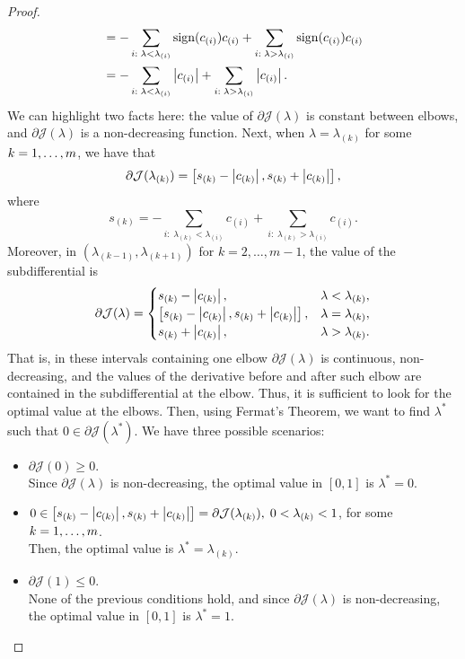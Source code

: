 \begin{proof}
\begin{equation}
\begin{aligned}
            &= - \sum_{i: \; \lambda < \lambda_{(i)}} \operatorname{sign}(c_{(i)}) {c_{(i)}} + \sum_{i: \; \lambda > \lambda_{(i)}} \operatorname{sign}(c_{(i)}) {c_{(i)}} \\
            &= - \sum_{i: \; \lambda < \lambda_{(i)}} \left|c_{(i)}\right| + \sum_{i: \; \lambda > \lambda_{(i)}} \left|c_{(i)}\right| .
        \end{aligned}        
    \end{equation}
    We can highlight two facts here: the value of $\partial \mathcal{J}(\lambda)$ is constant between elbows, and $\partial \mathcal{J}(\lambda)$ is a non-decreasing function.
    Next, when $\lambda = \lambda_{(k)}$ for some $k=1, \ldots, m$, we have that
    \begin{equation}
        \nonumber
        \partial \mathcal{J}(\lambda_{(k)}) = \left[ s_{(k)} - \left|c_{(k)}\right|, s_{(k)} + \left|c_{(k)}\right|   \right] ,
    \end{equation}
    where $$s_{(k)} = - \sum_{i: \; \lambda_{(k)} < \lambda_{(i)}} c_{(i)} + \sum_{i: \; \lambda_{(k)} > \lambda_{(i)}} c_{(i)}.$$
    Moreover, in $(\lambda_{(k-1)}, \lambda_{(k+1)})$ for $k=2, \ldots, m-1$, the value of the subdifferential is
    \begin{equation}
        \nonumber
        \partial \mathcal{J}(\lambda) = \begin{cases}
            s_{(k)} - \left|c_{(k)}\right|,& \lambda < \lambda_{(k)}, \\
            \left[ s_{(k)} - \left|c_{(k)}\right|, s_{(k)} + \left|c_{(k)}\right|   \right],& \lambda = \lambda_{(k)}, \\
            s_{(k)} + \left|c_{(k)}\right|,& \lambda > \lambda_{(k)} .
        \end{cases}
    \end{equation}
    That is, in these intervals containing one elbow  $\partial \mathcal{J}(\lambda)$ is continuous, non-decreasing, and the values of the derivative before and after such elbow are contained in the subdifferential at the elbow. Thus, it is sufficient to look for the optimal value at the elbows.
    Then, using Fermat's Theorem, we want to find $\lambda^*$ such that $0 \in \partial \mathcal{J}(\lambda^*)$. We have three possible scenarios:
    \begin{itemize}
        \item $\partial \mathcal{J}(0) \geq 0.$ 
        \\Since $\partial \mathcal{J}(\lambda)$ is non-decreasing, the optimal value in $[0, 1]$ is $\lambda^* = 0$.
        \item $0 \in \left[ s_{(k)} - \left|c_{(k)}\right|, s_{(k)} + \left|c_{(k)}\right|   \right] = \partial \mathcal{J}(\lambda_{(k)}), \; 0 < \lambda_{(k)} < 1$, for some $k=1, \ldots, m$. 
        \\Then, the optimal value is $\lambda^*=\lambda_{(k)}$.
        \item $\partial \mathcal{J}(1) \leq 0$. 
        \\None of the previous conditions hold, and since $\partial \mathcal{J}(\lambda)$ is non-decreasing, the optimal value in $[0, 1]$ is $\lambda^* = 1$.
    \end{itemize}
\end{proof}
